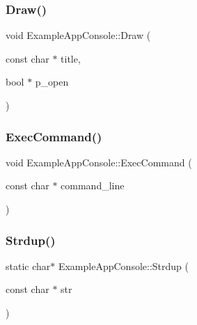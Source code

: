 \subsubsection{\texorpdfstring{Draw()}{Draw()}}
{\footnotesize\ttfamily void Example\+App\+Console\+::\+Draw (\begin{DoxyParamCaption}\item[{const char $\ast$}]{title,  }\item[{bool $\ast$}]{p\+\_\+open }\end{DoxyParamCaption})}

\hypertarget{struct_example_app_console_aa1e8bf1f3795cbc41597e1ff081c6589}{}\label{struct_example_app_console_aa1e8bf1f3795cbc41597e1ff081c6589} 
\subsubsection{\texorpdfstring{Exec\+Command()}{ExecCommand()}}
{\footnotesize\ttfamily void Example\+App\+Console\+::\+Exec\+Command (\begin{DoxyParamCaption}\item[{const char $\ast$}]{command\+\_\+line }\end{DoxyParamCaption})}

\hypertarget{struct_example_app_console_a61d0da41ef31ea8690b23681a1e54dba}{}\label{struct_example_app_console_a61d0da41ef31ea8690b23681a1e54dba} 
\subsubsection{\texorpdfstring{Strdup()}{Strdup()}}
{\footnotesize\ttfamily static char$\ast$ Example\+App\+Console\+::\+Strdup (\begin{DoxyParamCaption}\item[{const char $\ast$}]{str }\end{DoxyParamCaption})\hspace{0.3cm}{\ttfamily [static]}}

\hypertarget{struct_example_app_console_a6e5e5d66e77618eff0f89785261c9391}{}\label{struct_example_app_console_a6e5e5d66e77618eff0f89785261c9391} 
